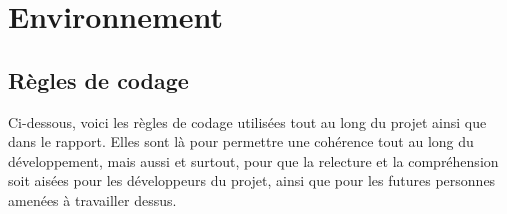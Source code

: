 \chapter{Environnement}
    \section{Règles de codage}
    Ci-dessous, voici les règles de codage utilisées tout au long du projet
ainsi que dans le rapport. Elles sont là pour permettre une cohérence tout au
long du développement, mais aussi et surtout, pour que la relecture et la 
compréhension soit aisées pour les développeurs du projet, ainsi que pour les
futures personnes amenées à travailler dessus.

